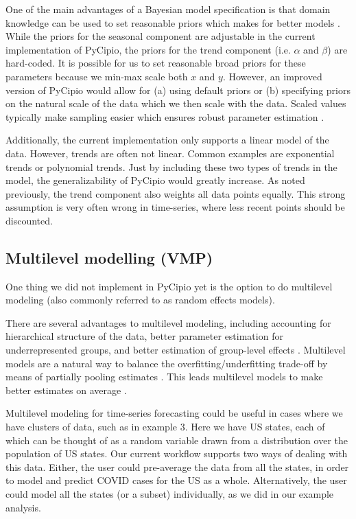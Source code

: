 \documentclass{article}
\begin{document}
\noindent One of the main advantages of a Bayesian model specification is that domain knowledge can be used to set reasonable priors which makes for better models \cite{McElreath}. While the priors for the seasonal component are adjustable in the current implementation of PyCipio, the priors for the trend component (i.e. $\alpha$ and $\beta$) are hard-coded. It is possible for us to set reasonable broad priors for these parameters because we min-max scale both $x$ and $y$. However, an improved version of PyCipio would allow for (a) using default priors or (b) specifying priors on the natural scale of the data which we then scale with the data. Scaled values typically make sampling easier which ensures robust parameter estimation \cite{Min-Max}.

\noindent Additionally, the current implementation only supports a linear model of the data. However, trends are often not linear. Common examples are exponential trends or polynomial trends. Just by including these two types of trends in the model, the generalizability of PyCipio would greatly increase. As noted previously, the trend component also weights all data points equally. This strong assumption is very often wrong in time-series, where less recent points should be discounted. 

\subsection{Multilevel modelling (VMP)}

\noindent One thing we did not implement in PyCipio yet is the option to do multilevel modeling (also commonly referred to as random effects models).

\noindent There are several advantages to multilevel modeling, including accounting for hierarchical structure of the data, better parameter estimation for underrepresented groups, and better estimation of group-level effects \cite{pymc3}. Multilevel models are a natural way to balance the overfitting/underfitting trade-off by means of partially pooling estimates \cite[p.~14]{McElreath}. This leads multilevel models to make better estimates on average \cite[p.~414]{McElreath}.

\noindent Multilevel modeling for time-series forecasting could be useful in cases where we have clusters of data, such as in example 3. Here we have US states, each of which can be thought of as a random variable drawn from a distribution over the population of US states. Our current workflow supports two ways of dealing with this data. Either, the user could pre-average the data from all the states, in order to model and predict COVID cases for the US as a whole. Alternatively, the user could model all the states (or a subset) individually, as we did in our example analysis.
\end{document}
